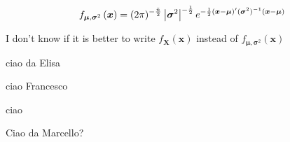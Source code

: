 \documentclass{article}
\begin{document}
\begin{equation*}
f_{\boldsymbol{\mu },\boldsymbol{\sigma }^{2}}\left( \boldsymbol{x}\right)
=(2\pi )^{-\frac{\bar{n}}{2}}\left\vert \boldsymbol{\sigma }^{2}\right\vert
^{-\frac{1}{2}}e^{-\frac{1}{2}\left( \boldsymbol{x}-\boldsymbol{\mu }\right)
^{\prime }(\boldsymbol{\sigma }^{2})^{-1}\left( \boldsymbol{x}-\boldsymbol{%
\mu }\right) }
\end{equation*}

I don't know if it is better to write $f_{\boldsymbol{X}}\left( \boldsymbol{x%
}\right) $ instead of $f_{\boldsymbol{\mu },\boldsymbol{\sigma }^{2}}\left( 
\boldsymbol{x}\right) $

\bigskip

ciao da Elisa

\bigskip

ciao Francesco

\bigskip

ciao

\bigskip


Ciao da Marcello?
\end{document}
